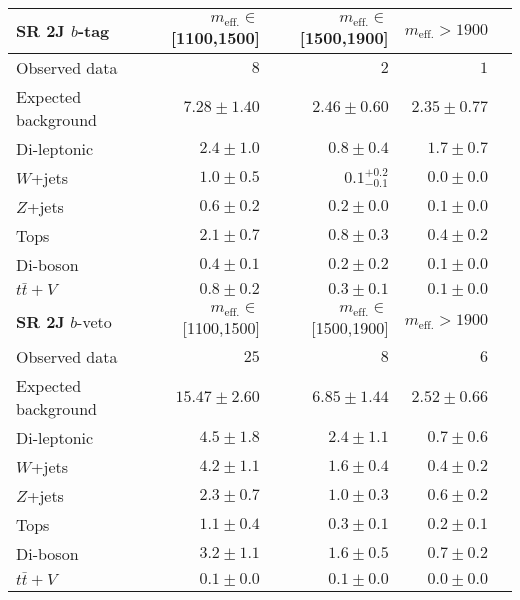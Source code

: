 \begin{tabular*}{\textwidth}{@{\extracolsep{\fill}}lrrrr}
\toprule
\textbf{SR 2J} $b$-tag & $m_{\mathrm{eff.}}\in$[1100,1500] & $m_{\mathrm{eff.}}\in$[1500,1900] & $m_{\mathrm{eff.}}>1900$ \\
\midrule

Observed data          & $8$              & $2$              & $1$                    \\
\midrule
Expected background         & $7.28 \pm 1.40$          & $2.46 \pm 0.60$          & $2.35 \pm 0.77$              \\
\midrule
        Di-leptonic         & $2.4 \pm 1.0$          & $0.8 \pm 0.4$          & $1.7 \pm 0.7$              \\
        $W$+jets         & $1.0 \pm 0.5$          & $0.1_{-0.1}^{+0.2}$          & $0.0 \pm 0.0$              \\
        $Z$+jets         & $0.6 \pm 0.2$          & $0.2 \pm 0.0$          & $0.1 \pm 0.0$              \\
        Tops         & $2.1 \pm 0.7$          & $0.8 \pm 0.3$          & $0.4 \pm 0.2$              \\
        Di-boson         & $0.4 \pm 0.1$          & $0.2 \pm 0.2$          & $0.1 \pm 0.0$              \\
        $t\bar{t}+V$         & $0.8 \pm 0.2$          & $0.3 \pm 0.1$          & $0.1 \pm 0.0$              \\
\toprule
\textbf{SR 2J} $b$-veto & $m_{\mathrm{eff.}}\in$[1100,1500] & $m_{\mathrm{eff.}}\in$[1500,1900] & $m_{\mathrm{eff.}}>1900$ \\
\midrule
Observed data          & $25$              & $8$              & $6$                    \\
\midrule
Expected background         & $15.47 \pm 2.60$          & $6.85 \pm 1.44$          & $2.52 \pm 0.66$              \\
\midrule
        Di-leptonic         & $4.5 \pm 1.8$          & $2.4 \pm 1.1$          & $0.7 \pm 0.6$              \\
        $W$+jets         & $4.2 \pm 1.1$          & $1.6 \pm 0.4$          & $0.4 \pm 0.2$              \\
        $Z$+jets         & $2.3 \pm 0.7$          & $1.0 \pm 0.3$          & $0.6 \pm 0.2$              \\
        Tops         & $1.1 \pm 0.4$          & $0.3 \pm 0.1$          & $0.2 \pm 0.1$              \\
        Di-boson         & $3.2 \pm 1.1$          & $1.6 \pm 0.5$          & $0.7 \pm 0.2$              \\
        $t\bar{t}+V$         & $0.1 \pm 0.0$          & $0.1 \pm 0.0$          & $0.0 \pm 0.0$              \\


\bottomrule
\end{tabular*}




